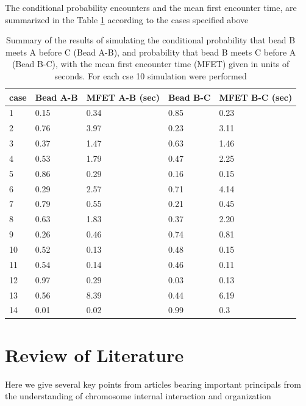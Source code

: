 \documentclass[12pt]{book}
\begin{document}
The conditional probability encounters and the mean first encounter time, are summarized in the Table \ref{table_conditionalEncouterProbabilityAndMFET}
according to the cases specified above
\begin{table}[H]

\begin{tabular}{l|l|l|l|l}
case & Bead A-B & MFET A-B (sec)&Bead B-C & MFET B-C (sec)\\
 \hline
1 & 0.15 & 0.34 & 0.85 & 0.23\\
2 & 0.76 & 3.97 & 0.23 & 3.11\\
3 & 0.37 & 1.47 & 0.63 & 1.46\\
4 & 0.53 & 1.79 & 0.47 & 2.25\\
5 & 0.86 & 0.29 & 0.16 & 0.15\\
6 & 0.29 & 2.57 & 0.71 & 4.14\\
7 & 0.79 & 0.55 & 0.21 & 0.45\\
8 & 0.63 & 1.83 & 0.37 & 2.20\\
9 & 0.26 & 0.46 & 0.74 & 0.81\\
10& 0.52 & 0.13 & 0.48 & 0.15\\
11& 0.54 & 0.14 & 0.46 & 0.11\\
12& 0.97 & 0.29 & 0.03 & 0.13\\
13& 0.56 & 8.39 & 0.44 & 6.19\\
14& 0.01 & 0.02 & 0.99 & 0.3
\end{tabular}
\caption{\scriptsize{Summary of the results of simulating the conditional probability that bead B meets A before C (Bead A-B), and probability that bead B meets C before A (Bead B-C), with the mean first encounter time (MFET) given in units of seconds. For each cse 10 simulation were performed}}\label{table_conditionalEncouterProbabilityAndMFET}
\end{table} 

\chapter{Review of Literature}\label{chapter_reviewOfLiterature}
Here we give several key points from articles bearing important principals from the understanding of chromosome internal interaction and organization 
\end{document}
